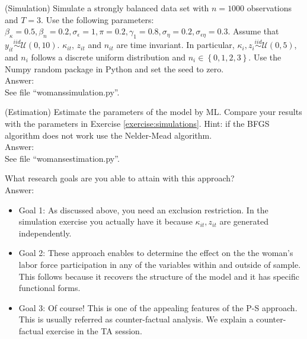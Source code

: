 \begin{exercise} (Simulation) \label{exercise:simulations}
Simulate a strongly balanced data set with $n = 1000$ observations and $T=3$. Use the following parameters: $\beta_\kappa = 0.5, \beta_n = 0.2, \sigma_\epsilon = 1, \pi = 0.2, \gamma_1 = 0.8, \sigma_\eta = 0.2, \sigma_{\epsilon \eta} = 0.3$. Assume that $y_{it} \overset{iid}{\sim} \mathcal{U} (0,10)$. $\kappa_{it}$, $z_{it}$ and $n_{it}$ are time invariant. In particular, $\kappa_{i}, z_{i} \overset{iid}{\sim} \mathcal{U} (0,5)$, and $n_{i}$ follows a discrete uniform distribution and $n_{i} \in \left\{0,1,2,3\right\}$. Use the Numpy random package in Python and set the seed to zero. \\
\noindent Answer:\\
\noindent See file ``womanssimulation.py''.
\end{exercise}

\begin{exercise} (Estimation)
Estimate the parameters of the model by ML. Compare your results with the parameters in Exercise \ref{exercise:simulations}. Hint: if the BFGS algorithm does not work use the Nelder-Mead algorithm.\\
\noindent Answer:\\
\noindent See file ``womansestimation.py''.
\end{exercise}

\begin{exercise} \label{exercise:psapproach}
What research goals are you able to attain with this approach?\\
\noindent Answer:\\
\begin{itemize}
\item Goal 1: As discussed above, you need an exclusion restriction. In the simulation exercise you actually have it because $\kappa_{it},z_{it}$ are generated independently.
\item Goal 2: These approach enables to determine the effect on the the woman's labor force participation in any of the variables within and outside of sample. This follows because it recovers the structure of the model and it has specific functional forms. 
\item Goal 3: Of course! This is one of the appealing features of the P-S approach. This is usually referred as counter-factual analysis. We explain a counter-factual exercise in the TA session.  
\end{itemize}
 
\end{exercise}

